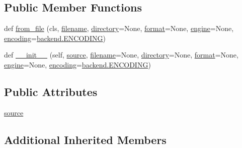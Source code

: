 \subsection*{Public Member Functions}
\begin{DoxyCompactItemize}
\item 
def \hyperlink{classgraphviz_1_1files_1_1Source_a9ae3935474228749fe76725bced884b5}{from\+\_\+file} (cls, \hyperlink{classgraphviz_1_1files_1_1File_ad8357bf1553bf74f1d05954c0a0986a8}{filename}, \hyperlink{classgraphviz_1_1files_1_1File_a17fd3abb3628eca94effe35cf1237a73}{directory}=None, \hyperlink{classgraphviz_1_1files_1_1File_acd2dce8967c8ff4c00ad6c47872dc340}{format}=None, \hyperlink{classgraphviz_1_1files_1_1File_aabc771621d8e81fccc4003231716e9cf}{engine}=None, \hyperlink{classgraphviz_1_1files_1_1File_aec4aaf697774bce61c327584985eb42b}{encoding}=\hyperlink{namespacegraphviz_1_1backend_aaa5c3555a484c96a0b0e5356ce3a577d}{backend.\+E\+N\+C\+O\+D\+I\+NG})
\item 
def \hyperlink{classgraphviz_1_1files_1_1Source_a112ffc61105ddbba9baa2e7de8a74690}{\+\_\+\+\_\+init\+\_\+\+\_\+} (self, \hyperlink{classgraphviz_1_1files_1_1Source_a06d02b8e20f6f3a352576d9e3e917054}{source}, \hyperlink{classgraphviz_1_1files_1_1File_ad8357bf1553bf74f1d05954c0a0986a8}{filename}=None, \hyperlink{classgraphviz_1_1files_1_1File_a17fd3abb3628eca94effe35cf1237a73}{directory}=None, \hyperlink{classgraphviz_1_1files_1_1File_acd2dce8967c8ff4c00ad6c47872dc340}{format}=None, \hyperlink{classgraphviz_1_1files_1_1File_aabc771621d8e81fccc4003231716e9cf}{engine}=None, \hyperlink{classgraphviz_1_1files_1_1File_aec4aaf697774bce61c327584985eb42b}{encoding}=\hyperlink{namespacegraphviz_1_1backend_aaa5c3555a484c96a0b0e5356ce3a577d}{backend.\+E\+N\+C\+O\+D\+I\+NG})
\end{DoxyCompactItemize}
\subsection*{Public Attributes}
\begin{DoxyCompactItemize}
\item 
\hyperlink{classgraphviz_1_1files_1_1Source_a06d02b8e20f6f3a352576d9e3e917054}{source}
\end{DoxyCompactItemize}
\subsection*{Additional Inherited Members}


